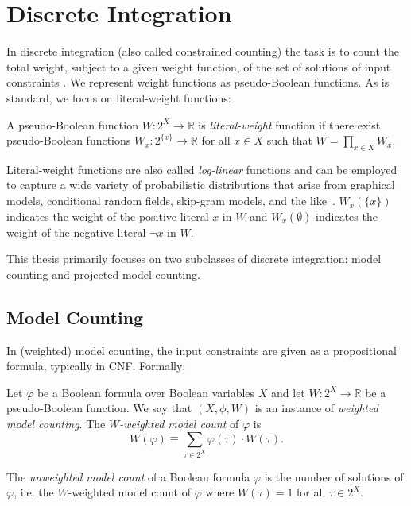 \section{Discrete Integration}
\label{sec:wmc}

In discrete integration (also called constrained counting) the task is to count the total weight, subject to a given weight function, of the set of solutions of input constraints \cite{GSS08}. We represent weight functions as pseudo-Boolean functions. As is standard, we focus on literal-weight functions: 
\begin{definition}
\label{def:literal-weight}
A pseudo-Boolean function $W: 2^X \rightarrow \mathbb{R}$ is \emph{literal-weight} function if there exist pseudo-Boolean functions $W_x: 2^{\{x\}} \rightarrow \mathbb{R}$ for all $x \in X$ such that $W = \prod_{x \in X} W_x$. 
\end{definition}
Literal-weight functions are also called \emph{log-linear} functions and can be employed to capture a wide variety of probabilistic distributions that arise from graphical models, conditional random fields, skip-gram models, and the like~\cite{KF09}.
$W_x(\{x\})$ indicates the weight of the positive literal $x$ in $W$ and $W_x(\emptyset)$ indicates the weight of the negative literal $\neg x$ in $W$.

This thesis primarily focuses on two subclasses of discrete integration: model counting and projected model counting.

\subsection{Model Counting}
In (weighted) model counting, the input constraints are given as a propositional formula, typically in CNF. Formally:
\begin{definition}
  Let $\varphi$ be a Boolean formula over Boolean variables $X$ and let $W: 2^X \rightarrow \mathbb{R}$ be a pseudo-Boolean function. We say that $(X, \phi, W)$ is an instance of \emph{weighted model counting}. The \emph{$W$-weighted model count} of $\varphi$ is
  $$W(\varphi) \equiv \sum_{\tau \in 2^X} \varphi(\tau) \cdot W(\tau).$$
\end{definition}

The \emph{unweighted model count} of a Boolean formula $\varphi$ is the number of solutions of $\varphi$, i.e. the $W$-weighted model count of $\varphi$ where $W(\tau) = 1$ for all $\tau \in 2^X$.

